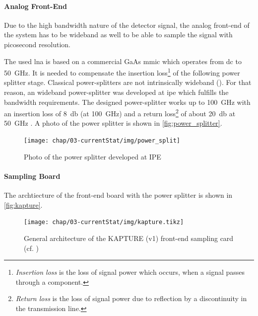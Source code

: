 \paragraph{Analog Front-End}
Due to the high bandwidth nature of the detector signal, the analog front-end of the system has to be wideband as well to be able to sample the signal with picosecond resolution. 

The used \gls{lna} is based on a commercial GaAs \gls{mmic} which operates from \gls{dc} to \SI{50}{\giga \hertz}. 
It is needed to compensate the insertion loss\footnote{\textit{Insertion loss} is the loss of signal power which occurs, when a signal passes through a component.} of the following power splitter stage. 
Classical power-splitters are not intrinsically wideband (\cite{caselle2014}). 
For that reason, an wideband power-splitter was developed at \gls{ipe} which fulfills the bandwidth requirements. 
The designed power-splitter works up to \SI{100}{\giga \hertz} with an insertion loss of \SI{8}{\decibel} (at \SI{100}{\GHz}) and a return loss\footnote{\textit{Return loss} is the loss of signal power due to reflection by a discontinuity in the transmission line.} of about \SI{20}{\decibel} at \SI{50}{\giga \hertz} \cite{caselle2014}.
A photo of the power splitter is shown in \autoref{fig:power_splitter}.

\begin{figure}[tbh]
	\centering
	\texttt{[image: chap/03-currentStat/img/power\_split]}
	\caption{Photo of the power splitter developed at IPE}
	\label{fig:power_splitter}
\end{figure}

\paragraph{Sampling Board}
The archtiecture of the front-end board with the power splitter is shown in \autoref{fig:kapture}. 
\begin{figure}[tbh]
	\centering
	\texttt{[image: chap/03-currentStat/img/kapture.tikz]}
	\caption[General architecture of the KAPTURE system]{General architecture of the KAPTURE (v1) front-end sampling card (cf. \cite[p.2]{caselleKAP})}
	\label{fig:kapture}
\end{figure}


